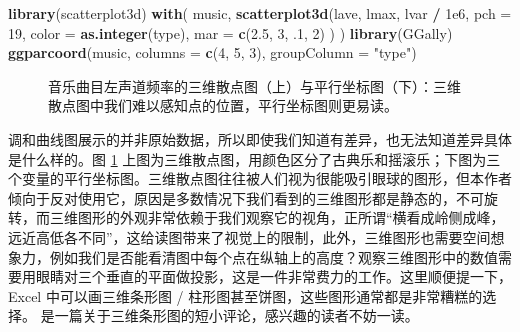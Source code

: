 \documentclass[
  b5paper,
  UTF8,twoside]{book}
\newenvironment{Shaded}{\begin{snugshade}}{\end{snugshade}}
\newcommand{\AttributeTok}[1]{\textcolor[rgb]{0.13,0.29,0.53}{#1}}
\newcommand{\DecValTok}[1]{\textcolor[rgb]{0.00,0.00,0.81}{#1}}
\newcommand{\FloatTok}[1]{\textcolor[rgb]{0.00,0.00,0.81}{#1}}
\newcommand{\FunctionTok}[1]{\textcolor[rgb]{0.13,0.29,0.53}{\textbf{#1}}}
\newcommand{\NormalTok}[1]{#1}
\newcommand{\SpecialCharTok}[1]{\textcolor[rgb]{0.81,0.36,0.00}{\textbf{#1}}}
\newcommand{\StringTok}[1]{\textcolor[rgb]{0.31,0.60,0.02}{#1}}
\begin{document}
\begin{Shaded}
\begin{Highlighting}[]
\FunctionTok{library}\NormalTok{(scatterplot3d)}
\FunctionTok{with}\NormalTok{(}
\NormalTok{  music,}
  \FunctionTok{scatterplot3d}\NormalTok{(lave, lmax, lvar }\SpecialCharTok{/} \FloatTok{1e6}\NormalTok{,}
    \AttributeTok{pch =} \DecValTok{19}\NormalTok{,}
    \AttributeTok{color =} \FunctionTok{as.integer}\NormalTok{(type), }\AttributeTok{mar =} \FunctionTok{c}\NormalTok{(}\FloatTok{2.5}\NormalTok{, }\DecValTok{3}\NormalTok{, .}\DecValTok{1}\NormalTok{, }\DecValTok{2}\NormalTok{)}
\NormalTok{  )}
\NormalTok{)}
\FunctionTok{library}\NormalTok{(GGally)}
\FunctionTok{ggparcoord}\NormalTok{(music, }\AttributeTok{columns =} \FunctionTok{c}\NormalTok{(}\DecValTok{4}\NormalTok{, }\DecValTok{5}\NormalTok{, }\DecValTok{3}\NormalTok{), }\AttributeTok{groupColumn =} \StringTok{"type"}\NormalTok{)}
\end{Highlighting}
\end{Shaded}

\begin{figure}

{\centering {}\newline{}\newline

}

\caption[ 音乐曲目左声道频率的三维散点图与平行坐标图 ]{音乐曲目左声道频率的三维散点图（上）与平行坐标图（下）：三维散点图中我们难以感知点的位置，平行坐标图则更易读。}\label{fig:music-3d-pcp}
\end{figure}



调和曲线图展示的并非原始数据，所以即使我们知道有差异，也无法知道差异具体是什么样的。图 \ref{fig:music-3d-pcp} 上图为三维散点图，用颜色区分了古典乐和摇滚乐；下图为三个变量的平行坐标图。三维散点图往往被人们视为很能吸引眼球的图形，但本作者倾向于反对使用它，原因是多数情况下我们看到的三维图形都是静态的，不可旋转，而三维图形的外观非常依赖于我们观察它的视角，正所谓``横看成岭侧成峰，远近高低各不同''，这给读图带来了视觉上的限制，此外，三维图形也需要空间想象力，例如我们是否能看清图中每个点在纵轴上的高度？观察三维图形中的数值需要用眼睛对三个垂直的平面做投影，这是一件非常费力的工作。这里顺便提一下，Excel 中可以画三维条形图 / 柱形图甚至饼图，这些图形通常都是非常糟糕的选择。\citet{Krause09} 是一篇关于三维条形图的短小评论，感兴趣的读者不妨一读。
\end{document}
